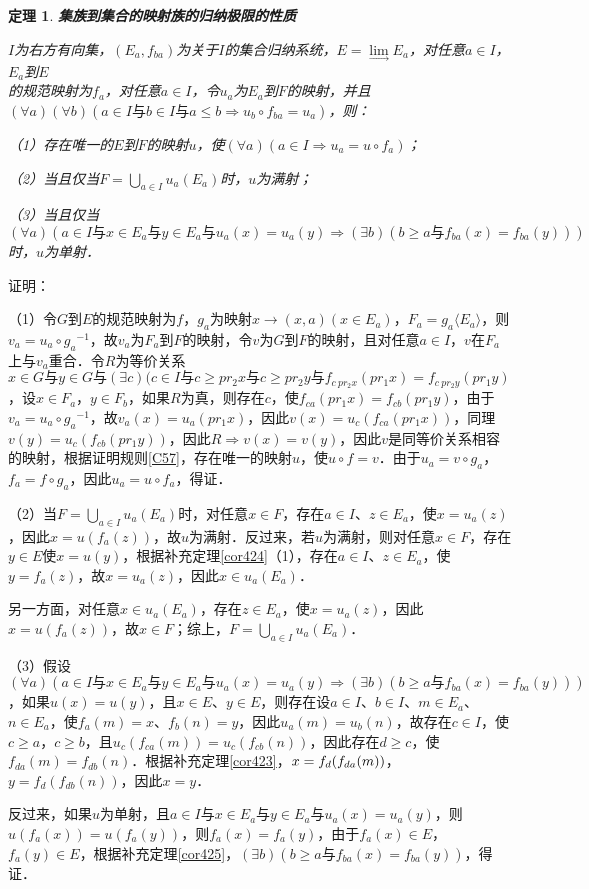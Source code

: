 \documentclass[12pt, a4paper, oneside]{book}
\newtheorem{theo}{定理}
\begin{document}
			\begin{theo}\label{theo184}
				\textbf{集族到集合的映射族的归纳极限的性质}\par
				$I$为右方有向集，$(E_a, f_{ba})$为关于$I$的集合归纳系统，$E= \lim\limits_\to E_a$，对任意$a\in I$，$E_a$到$E$\\的规范映射为$f_a$，对任意$a\in I$，令$u_a$为$E_a$到$F$的映射，并且$(\forall a)(\forall b)(a\in I\text{与}b\in I\text{与}a\leq b\Rightarrow u_b\circ f_{ba}=u_a)$，则：
				\par
				（1）存在唯一的$E$到$F$的映射$u$，使$(\forall a)(a\in I\Rightarrow u_a=u\circ f_a)$；
				\par
				（2）当且仅当$F=\bigcup\limits_{a\in I}u_a(E_a)$时，$u$为满射；
				\par
				（3）当且仅当$(\forall a)(a\in I\text{与}x\in E_a\text{与}y\in E_a\text{与}u_a(x)=u_a(y)\Rightarrow (\exists b)(b\geq a\text{与}f_{ba}(x)=f_{ba}(y)))$时，$u$为单射．
			\end{theo}
			证明：
			\par
			（1）令$G$到$E$的规范映射为$f$，$g_a$为映射$x\to (x, a)(x\in E_a)$，$F_a=g_a\langle E_a\rangle$，则 $v_a=u_a\circ {g_a}^{-1}$，故$v_a$为$F_a$到$F$的映射，令$v$为$G$到$F$的映射，且对任意$a\in I$，$v$在$F_a$上与$v_a$重合．令$R$为等价关系$x\in G\text{与}y\in G \text{与}(\exists c)(c\in I\text{与}c\geq pr_2x\text{与}c\geq pr_2y\text{与}f_{c\ pr_2x}(pr_1x)= f_{c\ pr_2y}(pr_1y)$，设$x\in F_a$，$y\in F_b$，如果$R$为真，则存在$c$，使$f_{ca}(pr_1x)=f_{cb}(pr_1y)$，由于$v_a=u_a\circ {g_a}^{-1}$，故$v_a(x)=u_a(pr_1x)$，因此$v(x)=u_c(f_{ca}(pr_1x))$，同理$v(y)=u_c(f_{cb}(pr_1y))$，因此$R\Rightarrow v(x)=v(y)$，因此$v$是同等价关系相容的映射，根据证明规则\ref{C57}，存在唯一的映射$u$，使$u\circ f=v$．由于$u_a=v\circ g_a$，$f_a=f\circ g_a$，因此$u_a=u\circ f_a$，得证．
			\par
			（2）当$F=\bigcup\limits_{a\in I}u_a(E_a)$时，对任意$x\in F$，存在$a\in I$、$z\in E_a$，使$x=u_a(z)$，因此$x=u(f_a(z))$，故$u$为满射．反过来，若$u$为满射，则对任意$x\in F$，存在$y\in E$使$x=u(y)$，根据补充定理\ref{cor424}（1），存在$a\in I$、$z\in E_a$，使$y=f_a(z)$，故$x=u_a(z)$，因此$x\in u_a(E_a)$．
			\par
			另一方面，对任意$x\in u_a(E_a)$，存在$z\in E_a$，使$x=u_a(z)$，因此$x=u(f_a(z))$，故$x\in F$；综上，$F=\bigcup\limits_{a\in I}u_a(E_a)$．
			\par
			（3）假设$(\forall a)(a\in I\text{与}x\in E_a\text{与}y\in E_a\text{与}u_a(x)=u_a(y)\Rightarrow (\exists b)(b\geq a\text{与}f_{ba}(x)=f_{ba}(y)))$，如果$u(x)=u(y)$，且$x\in E$、$y\in E$，则存在设$a\in I$、$b\in I$、$m\in E_a$、$n\in E_a$，使$f_a(m)=x$、$f_b(n)=y$，因此$u_a(m)=u_b(n)$，故存在$c\in I$，使$c\geq a$，$c\geq b$，且$u_c(f_{ca}(m))=u_c(f_{cb}(n))$，因此存在$d\geq c$，使$f_{da}(m)=f_{db}(n)$．根据补充定理\ref{cor423}，$x=\\f_d(f_{da}(m))$，$y=f_d(f_{db}(n))$，因此$x=y$．
			\par
			反过来，如果$u$为单射，且$a\in I\text{与}x\in E_a\text{与}y\in E_a\text{与}u_a(x)=u_a(y)$，则$u(f_a(x))=u(f_a(y))$，则$f_a(x)= f_a(y)$，由于$f_a(x)\in E$，$f_a(y) \in E$，根据补充定理\ref{cor425}，$(\exists b)(b\geq a\text{与}f_{ba}(x)=f_{ba}(y))$，得证．
			
\end{document}

